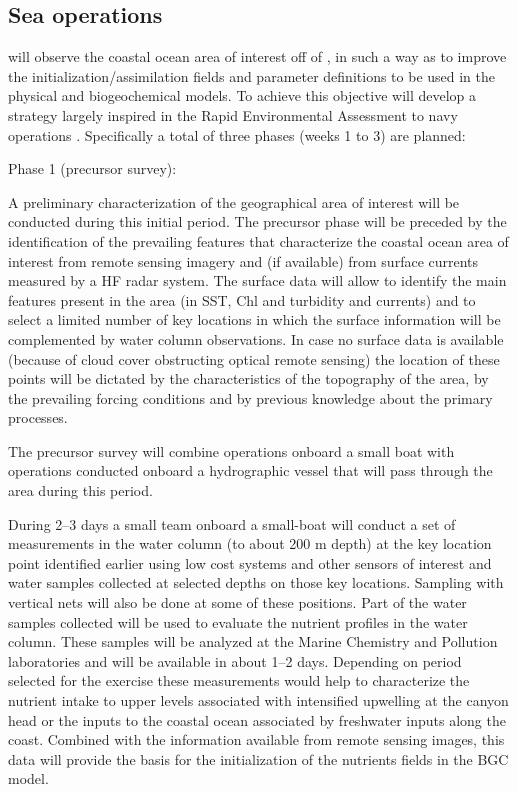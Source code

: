   
\subsection{Sea operations}
 
\proj will observe the coastal ocean area of interest off of \naz, in
such a way as to improve the initialization/assimilation fields and
parameter definitions to be used in the physical and biogeochemical
models. To achieve this objective \proj will develop a strategy largely
inspired in the Rapid Environmental Assessment to navy operations
. Specifically a total of three phases (weeks 1 to 3) are
planned:
 
Phase 1 (precursor survey):
 
A preliminary characterization of the geographical area of interest will
be conducted during this initial period. The precursor phase will be
preceded by the identification of the prevailing features that
characterize the coastal ocean area of interest from remote sensing
imagery and (if available) from surface currents measured by a HF radar
system. The surface data will allow to identify the main features
present in the area (in SST, Chl and turbidity and currents) and to
select a limited number of key locations in which the surface
information will be complemented by water column observations. In case
no surface data is available (because of cloud cover obstructing optical
remote sensing) the location of these points will be dictated by the
characteristics of the topography of the area, by the prevailing forcing
conditions and by previous knowledge about the primary processes.
 
The precursor survey will combine operations onboard a small boat with
operations conducted onboard a \inst hydrographic vessel that will pass
through the area during this period. 
 
During 2--3 days a small team onboard a small-boat will conduct a set of
measurements in the water column (to about 200 m depth) at the key
location point identified earlier using low cost systems  and other sensors of interest and water samples collected at
selected depths on those key locations. Sampling with vertical nets will
also be done at some of these positions. Part of the water samples
collected will be used to evaluate the nutrient profiles in the water
column. These samples will be analyzed at the \inst Marine Chemistry and
Pollution laboratories and will be available in about 1--2 days.
Depending on period selected for the exercise these measurements would
help to characterize the nutrient intake to upper levels associated
with intensified upwelling at the canyon head or the inputs to the
coastal ocean associated by freshwater inputs along the coast. Combined
with the information available from remote sensing images, this data will
provide the basis for the initialization of the nutrients fields in the
BGC model.
 
